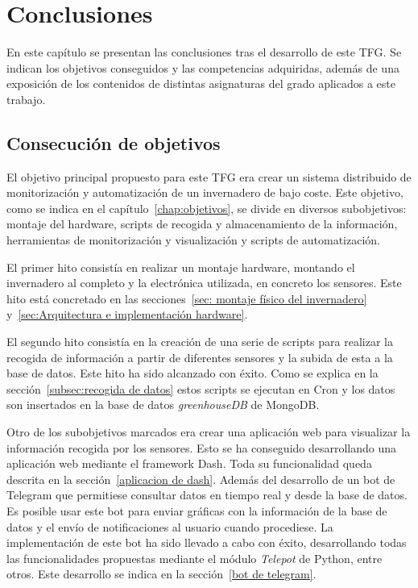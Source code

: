 \documentclass[a4paper, 12pt, oneside]{book}
\begin{document}

\cleardoublepage
\chapter{Conclusiones}
\label{chap:conclusiones}
En este capítulo se presentan las conclusiones tras el desarrollo de este TFG. Se indican los objetivos conseguidos y las competencias adquiridas, además de una exposición de los contenidos de distintas asignaturas del grado aplicados a este trabajo.

\section{Consecución de objetivos}
\label{sec:consecución de objetivos}
El objetivo principal propuesto para este TFG era crear un sistema distribuido de monitorización y automatización de un invernadero de bajo coste. Este objetivo, como se indica en el capítulo~\ref{chap:objetivos}, se divide en diversos subobjetivos: montaje del hardware, scripts de recogida y almacenamiento de la información, herramientas de monitorización y visualización y scripts de automatización.

El primer hito consistía en realizar un montaje hardware, montando el invernadero al completo y la electrónica utilizada, en concreto los sensores. Este hito está concretado en las secciones~\ref{sec: montaje físico del invernadero} y~\ref{sec:Arquitectura e implementación hardware}.

El segundo hito consistía en la creación de una serie de scripts para realizar la recogida de información a partir de diferentes sensores y la subida de esta a la base de datos. Este hito ha sido alcanzado con éxito. Como se explica en la sección~\ref{subsec:recogida de datos} estos scripts se ejecutan en Cron y los datos son insertados en la base de datos \textit{greenhouseDB} de MongoDB.

Otro de los subobjetivos marcados era crear una aplicación web para visualizar la información recogida por los sensores. Esto se ha conseguido desarrollando una aplicación web mediante el framework Dash. Toda su funcionalidad queda descrita en la sección~\ref{aplicacion de dash}.
Además del desarrollo de un bot de Telegram que permitiese consultar datos en tiempo real y desde la base de datos. Es posible usar este bot para enviar gráficas con la información de la base de datos y el envío de notificaciones al usuario cuando procediese. La implementación de este bot ha sido llevado a cabo con éxito, desarrollando todas las funcionalidades propuestas mediante el módulo \textit{Telepot} de Python, entre otros. Este desarrollo se indica en la sección~\ref{bot de telegram}.
\end{document}
